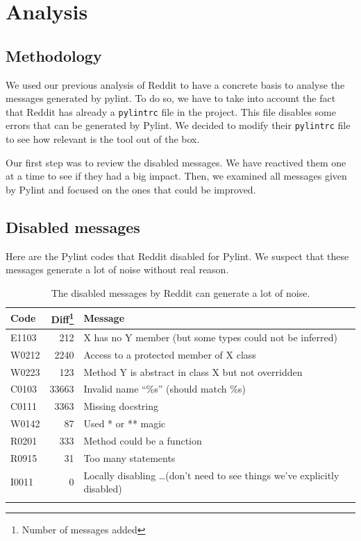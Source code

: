 \documentclass[11pt, a4paper]{article}
\newcommand{\pyl}{\textsf{Pylint}}
\begin{document}
\section*{Analysis}
\subsection*{Methodology}

We used our previous analysis of Reddit to have a concrete basis to analyse the messages generated by pylint.
To do so, we have to take into account the fact that Reddit has already a \texttt{pylintrc} file in the project.
This file disables some errors that can be generated by \pyl{}.
We decided to modify their \texttt{pylintrc} file to see how relevant is the tool out of the box.
\medskip


Our first step was to review the disabled messages.
We have reactived them one at a time to see if they had a big impact.
Then, we examined all messages given by \pyl{} and focused on the ones that could be improved.

\subsection*{Disabled messages}
Here are the \pyl{} codes that Reddit disabled for \pyl{}. 
We suspect that these messages generate a lot of noise without real reason.
\\

\begin{longtable}{|l|r|m{9cm}|}
\hline
\textbf{\small{Code}} & \textbf{\small{Diff\footnote{Number of messages added}}} & \textbf{\small{Message}} \\
\hline
\hline
E1103 & 212 & X has no Y member (but some types could not be inferred) \\
\hline
W0212 & 2240  & Access to a protected member of X class \\
\hline
W0223 & 123 & Method Y is abstract in class X but not overridden \\
\hline
C0103 & 33663 & Invalid name ``\%s'' (should match \%s) \\
\hline
C0111 & 3363 & Missing docstring \\
\hline
W0142 & 87 & Used * or ** magic \\
\hline
R0201 & 333 & Method could be a function \\
\hline
R0915 & 31 & Too many statements \\
\hline
I0011 & 0 & Locally disabling \dots (don't need to see things we've explicitly disabled) \\
\hline
\caption{\label{messages} The disabled messages by Reddit can generate a lot of noise. }
\end{longtable}
\end{document}
